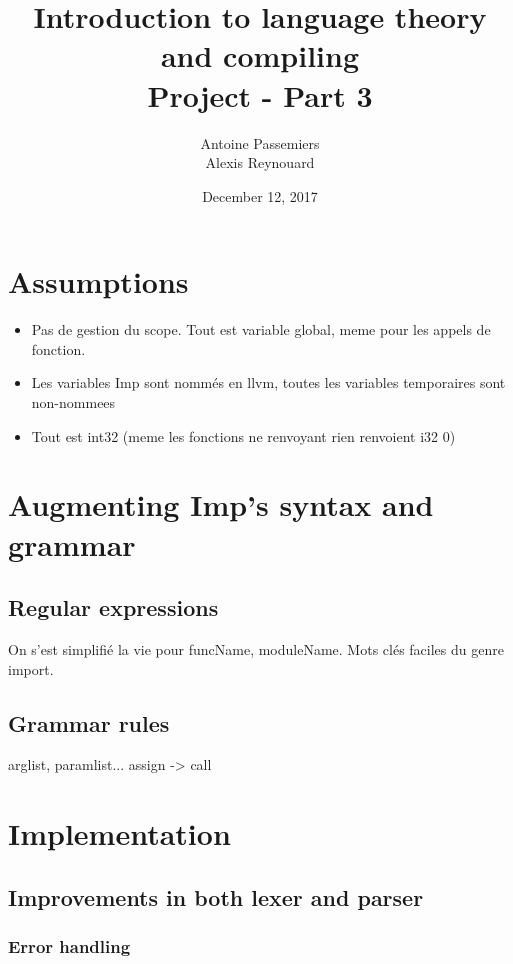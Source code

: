\documentclass[12pt]{report}
\title{Introduction to language theory and compiling \\ Project - Part 3}
\author{Antoine Passemiers \\ Alexis Reynouard}
\date{December 12, 2017}
\begin{document}
\maketitle
\setcounter{tocdepth}{3}
\setcounter{secnumdepth}{3}
\setcounter{chapter}{0}
\tableofcontents
\pagebreak
\clearpage
\setcounter{page}{1}

\chapter{Assumptions}

\begin{itemize}
\item Pas de gestion du scope. Tout est variable global, meme pour les appels de fonction.
\item Les variables Imp sont nommés en llvm, toutes les variables temporaires sont non-nommees
\item Tout est int32 (meme les fonctions ne renvoyant rien renvoient i32 0)
\end{itemize}

\chapter{Augmenting Imp's syntax and grammar}

\section{Regular expressions}

On s'est simplifié la vie pour funcName, moduleName.
Mots clés faciles du genre import.

\section{Grammar rules}

arglist, paramlist... assign -> call

\chapter{Implementation}

\section{Improvements in both lexer and parser}

\subsection{Error handling}
\end{document}

